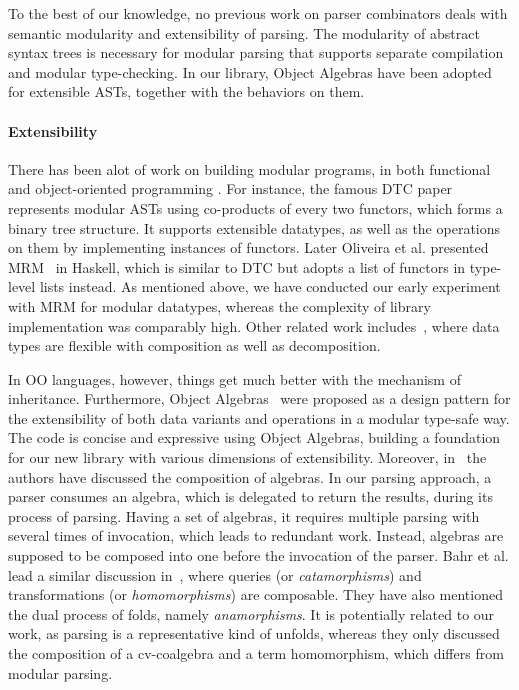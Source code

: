 To the best of our knowledge, no previous work on parser combinators 
deals with semantic modularity and
extensibility of parsing. The modularity of abstract syntax trees is
necessary for modular parsing that supports separate compilation and
modular type-checking. In our library, Object Algebras have been
adopted for extensible ASTs, together with the behaviors on them.

\paragraph*{Extensibility} There has been alot of work on building
modular programs, in both functional and object-oriented programming .
For instance, the famous DTC paper~\cite{swierstra2008} represents
modular ASTs using co-products of every two functors, which forms a
binary tree structure. It supports extensible datatypes, as well as
the operations on them by implementing instances of functors. Later
Oliveira et al. presented MRM~\cite{Oliveira2015} in Haskell, which is
similar to DTC but adopts a list of functors in type-level lists
instead. As mentioned above, we have conducted our early experiment
with MRM for modular datatypes, whereas the complexity of library
implementation was comparably high. Other related work
includes~\cite{Bahr2014}, where data types are flexible with
composition as well as decomposition.

In OO languages, however, things get much better with the mechanism of
inheritance. Furthermore, Object Algebras~\cite{Oliveira2012} were
proposed as a design pattern for the extensibility of both data
variants and operations in a modular type-safe way. The code is
concise and expressive using Object Algebras, building a foundation
for our new library with various dimensions of extensibility.
Moreover, in~\cite{Oliveira2012} the authors have discussed the
composition of algebras. In our parsing approach, a parser consumes an
algebra, which is delegated to return the results, during its process
of parsing. Having a set of algebras, it requires multiple parsing
with several times of invocation, which leads to redundant work.
Instead, algebras are supposed to be composed into one before the
invocation of the parser. Bahr et al. lead a similar discussion
in~\cite{Bahr2011}, where queries (or \textit{catamorphisms}) and
transformations (or \textit{homomorphisms}) are composable. They have
also mentioned the dual process of folds, namely
\textit{anamorphisms}. It is potentially related to our work, as
parsing is a representative kind of unfolds, whereas they only
discussed the composition of a cv-coalgebra and a term homomorphism,
which differs from modular parsing. 

